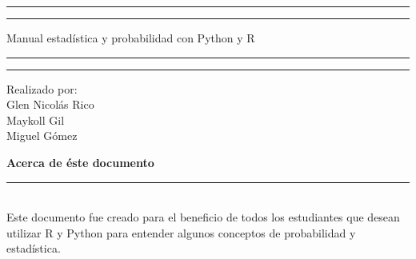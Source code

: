 \documentclass[12pt,hidelinks]{article}
\begin{document}
	\begin{titlepage}
		\centering %
		\scshape %
		\vspace*{1.5\baselineskip} %
		
		\rule{13cm}{1.6pt}\vspace*{-\baselineskip}\vspace*{2pt} %
		\rule{13cm}{0.4pt} %
		
		\vspace{0.75\baselineskip} %
		{	\Huge Manual estadística y probabilidad con Python y R }
		\vspace{0.75\baselineskip} %
		\rule{13cm}{0.4pt}\vspace*{-\baselineskip}\vspace{3.2pt} %
		\rule{13cm}{1.6pt} %
		
		\vspace{1.75\baselineskip} %
		{\large Realizado por:
			\vspace*{1.2\baselineskip}\\
			Glen Nicolás Rico\\
			Maykoll Gil\\
			Miguel Gómez
		}\\
		\vfill
		
	\end{titlepage}
	\tableofcontents
	\vfill
	\small{\noindent \textbf{Acerca de éste documento} \vspace{-3mm}\\
		\noindent \rule{3.3cm}{0.5pt} \\
		Este documento fue creado para el beneficio de todos los estudiantes que desean utilizar R y Python para entender algunos conceptos de probabilidad y estadística.}
	\newpage
\end{document}
